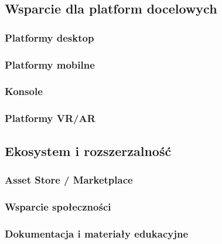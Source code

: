 \subsection{Wsparcie dla platform docelowych}
\subsubsection{Platformy desktop}

\subsubsection{Platformy mobilne}

\subsubsection{Konsole}

\subsubsection{Platformy VR/AR}

\subsection{Ekosystem i rozszerzalność}
\subsubsection{Asset Store / Marketplace}

\subsubsection{Wsparcie społeczności}

\subsubsection{Dokumentacja i materiały edukacyjne}
